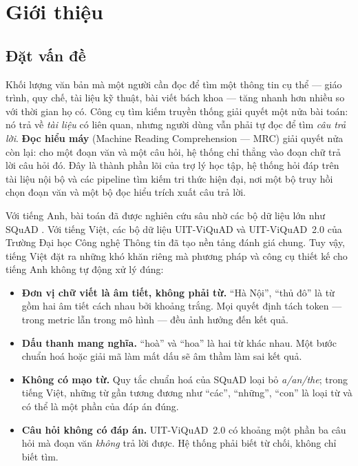 \section{Giới thiệu}
\label{sec:intro}

\subsection{Đặt vấn đề}

Khối lượng văn bản mà một người cần đọc để tìm một thông tin cụ thể --- giáo trình,
quy chế, tài liệu kỹ thuật, bài viết bách khoa --- tăng nhanh hơn nhiều so với thời
gian họ có. Công cụ tìm kiếm truyền thống giải quyết một nửa bài toán: nó trả về
\emph{tài liệu} có liên quan, nhưng người dùng vẫn phải tự đọc để tìm \emph{câu trả
lời}. \textbf{Đọc hiểu máy} (Machine Reading Comprehension --- MRC) giải quyết nửa còn
lại: cho một đoạn văn và một câu hỏi, hệ thống chỉ thẳng vào đoạn chữ trả lời câu hỏi
đó. Đây là thành phần lõi của trợ lý học tập, hệ thống hỏi đáp trên tài liệu nội bộ và
các pipeline tìm kiếm tri thức hiện đại, nơi một bộ truy hồi chọn đoạn văn và một bộ
đọc hiểu trích xuất câu trả lời.

Với tiếng Anh, bài toán đã được nghiên cứu sâu nhờ các bộ dữ liệu lớn như SQuAD
\cite{rajpurkar2016squad,rajpurkar2018know}. Với tiếng Việt, các bộ dữ liệu UIT-ViQuAD
\cite{nguyen2020viquad} và UIT-ViQuAD~2.0 \cite{nguyen2022vlsp} của Trường Đại học Công
nghệ Thông tin đã tạo nền tảng đánh giá chung. Tuy vậy, tiếng Việt đặt ra những khó khăn
riêng mà phương pháp và công cụ thiết kế cho tiếng Anh không tự động xử lý đúng:

\begin{itemize}
  \item \textbf{Đơn vị chữ viết là âm tiết, không phải từ.} ``Hà Nội'', ``thủ đô'' là
        từ gồm hai âm tiết cách nhau bởi khoảng trắng. Mọi quyết định tách token --- trong
        metric lẫn trong mô hình --- đều ảnh hưởng đến kết quả.
  \item \textbf{Dấu thanh mang nghĩa.} ``hoà'' và ``hoa'' là hai từ khác nhau. Một
        bước chuẩn hoá hoặc giải mã làm mất dấu sẽ âm thầm làm sai kết quả.
  \item \textbf{Không có mạo từ.} Quy tắc chuẩn hoá của SQuAD loại bỏ \emph{a/an/the};
        trong tiếng Việt, những từ gần tương đương như ``các'', ``những'', ``con'' là
        loại từ và có thể là một phần của đáp án đúng.
  \item \textbf{Câu hỏi không có đáp án.} UIT-ViQuAD~2.0 có khoảng một phần ba câu hỏi
        mà đoạn văn \emph{không} trả lời được. Hệ thống phải biết từ chối, không chỉ biết
        tìm.
\end{itemize}

